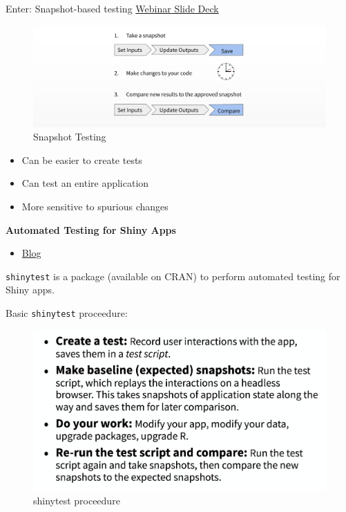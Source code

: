 \documentclass[]{book}
\providecommand{\tightlist}{%
  \setlength{\itemsep}{0pt}\setlength{\parskip}{0pt}}
\theoremstyle{definition}
\theoremstyle{definition}
\theoremstyle{definition}
\theoremstyle{remark}
\begin{document}
Enter: Snapshot-based testing
\href{https://github.com/rstudio/webinars/blob/master/48-shinytest/shinytest.pdf}{Webinar
Slide Deck}

\begin{figure}
\centering
\includegraphics{imgs/testing/snapshot-testing.png}
\caption{Snapshot Testing}
\end{figure}

\begin{itemize}
\tightlist
\item
  Can be easier to create tests
\item
  Can test an entire application
\item
  More sensitive to spurious changes
\end{itemize}

\textbf{Automated Testing for Shiny Apps}

\begin{itemize}
\tightlist
\item
  \href{https://resources.rstudio.com/rstudio-blog/shinytest-automated-testing-for-shiny-apps}{Blog}
\end{itemize}

\texttt{shinytest} is a package (available on CRAN) to perform automated
testing for Shiny apps.

Basic \texttt{shinytest} proceedure:

\begin{figure}
\centering
\includegraphics{imgs/testing/testing-proceedure.png}
\caption{shinytest proceedure}
\end{figure}
\end{document}
